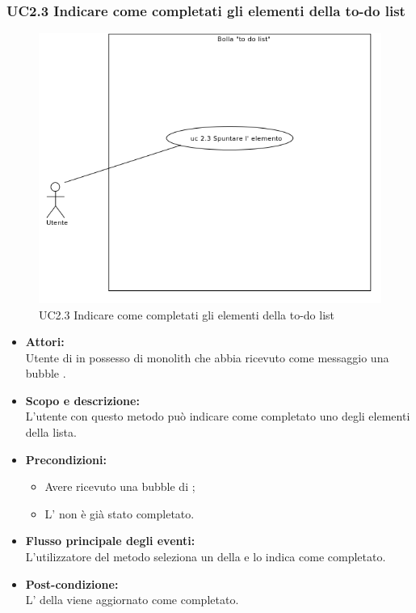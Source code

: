 \subsubsection{UC2.3 Indicare come completati gli elementi della to-do list} \label{UC2.3}

\begin{figure}[H]
	\centering
	\includegraphics[width=15cm]{../../documenti/AnalisiDeiRequisiti/Diagrammi_img/uc2_3.png}
	\caption{UC2.3 Indicare come completati gli elementi della to-do list}
\end{figure}

\begin{itemize}
	\item \textbf{Attori:}
	\\Utente di  in possesso di monolith che abbia ricevuto come messaggio una bubble .
	\item \textbf{Scopo e descrizione:} 
	\\L’utente con questo metodo può indicare come completato uno degli elementi della lista.
	\item \textbf{Precondizioni:}
	\begin{itemize}
		\item Avere ricevuto una bubble di ;
		\item L’ non è già stato completato.
	\end{itemize}
	\item \textbf{Flusso principale degli eventi:}
	\\L’utilizzatore del metodo seleziona un  della  e lo indica come completato. 
	\item \textbf{Post-condizione:}
	\\L’ della  viene aggiornato come completato.
\end{itemize}

